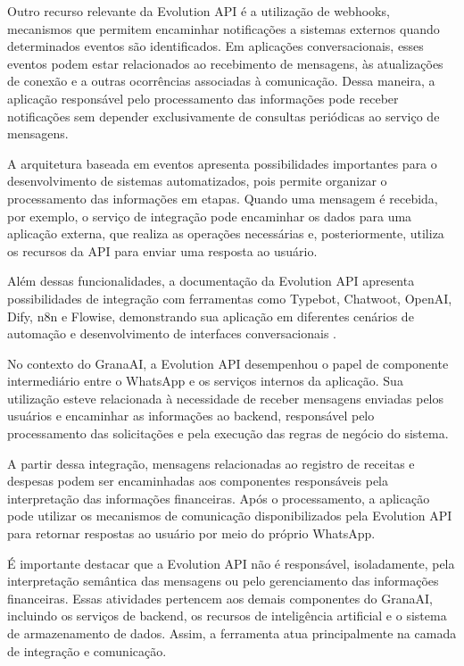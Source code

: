 Outro recurso relevante da Evolution API é a utilização de webhooks, mecanismos que permitem encaminhar notificações a sistemas externos quando determinados eventos são identificados. Em aplicações conversacionais, esses eventos podem estar relacionados ao recebimento de mensagens, às atualizações de conexão e a outras ocorrências associadas à comunicação. Dessa maneira, a aplicação responsável pelo processamento das informações pode receber notificações sem depender exclusivamente de consultas periódicas ao serviço de mensagens.

A arquitetura baseada em eventos apresenta possibilidades importantes para o desenvolvimento de sistemas automatizados, pois permite organizar o processamento das informações em etapas. Quando uma mensagem é recebida, por exemplo, o serviço de integração pode encaminhar os dados para uma aplicação externa, que realiza as operações necessárias e, posteriormente, utiliza os recursos da API para enviar uma resposta ao usuário.

Além dessas funcionalidades, a documentação da Evolution API apresenta possibilidades de integração com ferramentas como Typebot, Chatwoot, OpenAI, Dify, n8n e Flowise, demonstrando sua aplicação em diferentes cenários de automação e desenvolvimento de interfaces conversacionais \cite{evolution_api_docs_2026}.

No contexto do GranaAI, a Evolution API desempenhou o papel de componente intermediário entre o WhatsApp e os serviços internos da aplicação. Sua utilização esteve relacionada à necessidade de receber mensagens enviadas pelos usuários e encaminhar as informações ao backend, responsável pelo processamento das solicitações e pela execução das regras de negócio do sistema.

A partir dessa integração, mensagens relacionadas ao registro de receitas e despesas podem ser encaminhadas aos componentes responsáveis pela interpretação das informações financeiras. Após o processamento, a aplicação pode utilizar os mecanismos de comunicação disponibilizados pela Evolution API para retornar respostas ao usuário por meio do próprio WhatsApp.

É importante destacar que a Evolution API não é responsável, isoladamente, pela interpretação semântica das mensagens ou pelo gerenciamento das informações financeiras. Essas atividades pertencem aos demais componentes do GranaAI, incluindo os serviços de backend, os recursos de inteligência artificial e o sistema de armazenamento de dados. Assim, a ferramenta atua principalmente na camada de integração e comunicação.

